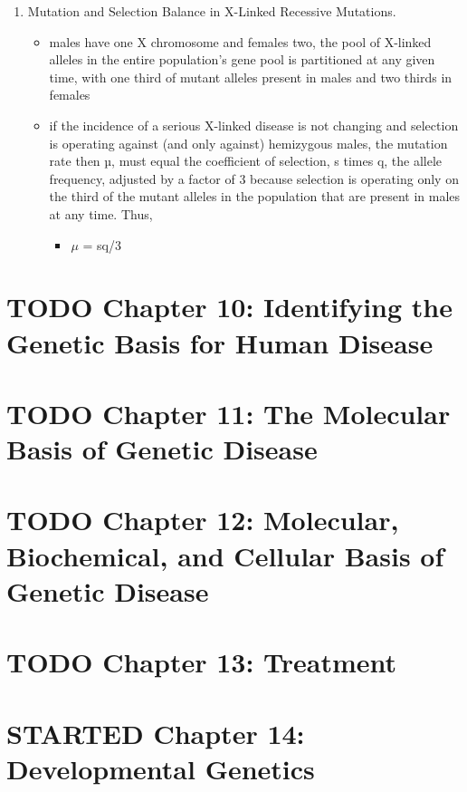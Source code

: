 \documentclass{scrartcl}
\begin{document}
\begin{enumerate}
\item Mutation and Selection Balance in X-Linked Recessive Mutations.
\label{sec:org4792f7a}
\begin{itemize}
\item males have one X chromosome and females two, the pool of X-linked
alleles in the entire population’s gene pool is partitioned at any
given time, with one third of mutant alleles present in males and
two thirds in females
\item if the incidence of a serious X-linked disease is not changing and
selection is operating against (and only against) hemizygous males,
the mutation rate then µ, must equal the coefficient of selection, s
times q, the allele frequency, adjusted by a factor of 3 because
selection is operating only on the third of the mutant alleles in
the population that are present in males at any time. Thus,
\begin{itemize}
\item \(\mu\) = sq/3
\end{itemize}
\end{itemize}
\end{enumerate}


\section{{\bfseries\sffamily TODO} Chapter 10: Identifying the Genetic Basis for Human Disease}
\label{sec:org9bda9ce}
\section{{\bfseries\sffamily TODO} Chapter 11: The Molecular Basis of Genetic Disease}
\label{sec:org2834d4f}
\section{{\bfseries\sffamily TODO} Chapter 12: Molecular, Biochemical, and Cellular Basis of Genetic Disease}
\label{sec:org83409d8}
\section{{\bfseries\sffamily TODO} Chapter 13: Treatment}
\label{sec:org36fd37d}
\section{{\bfseries\sffamily STARTED} Chapter 14: Developmental Genetics}
\label{sec:org6682a2c}
\end{document}
